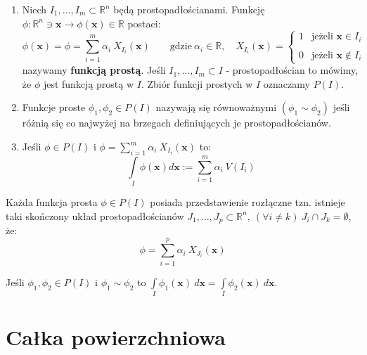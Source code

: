 \begin{df}
	\begin{enumerate}
		\item
		Niech $I_{1},\ldots,I_{m}\subset\mathbb{R}^{n}$ będą prostopadłościanami. Funkcję \linebreak[4]$\phi:\mathbb{R}^{n}\ni\mathbf x\rightarrow\phi(\mathbf x)\in\mathbb{R}$ postaci:
		\begin{displaymath}
		\phi(\mathbf x)=\phi=\sum_{i=1}^{m}\alpha_{i}\ X_{I_{i}}(\mathbf x)\qquad\textrm{gdzie}\ \alpha_{i}\in\mathbb{R},\quad X_{I_{i}}(\mathbf x)=\left\{\begin{array}{ll}
		1  & \textrm{jeżeli $\mathbf x\in I_{i}$}
		\\
		\\0 & \textrm{jeżeli $\mathbf x\notin I_{i}$}
		\end{array} \right.
		\end{displaymath}
		nazywamy \textbf{funkcją prostą}. Jeśli $I_{1},\ldots,I_{m}\subset I$ - prostopadłościan to mówimy, że $\phi$ jest funkcją prostą w $I$. Zbiór funkcji prostych w $I$ oznaczamy $P(I)$.
		\item
		Funkcje proste $\phi_{1},\phi_{2}\in P(I)$ nazywają się równoważnymi $(\phi_{1}\sim\phi_{2})$ jeśli różnią się co najwyżej na brzegach definiujących je prostopadłościanów.
		\item
		Jeśli $\phi\in P(I)$ i $\displaystyle\phi=\sum_{i=1}^{m}\alpha_{i}\ X_{I_{i}}(\mathbf x)$ to:
		$$\int\limits_{I}\phi(\mathbf x)d\mathbf x:=\sum_{i=1}^{m}\alpha_{i}\ V(I_{i})$$
	\end{enumerate}
\end{df}

\begin{uwg}
	Każda funkcja prosta $\phi\in P(I)$ posiada przedstawienie rozłączne tzn. istnieje taki skończony układ prostopadłościanów $J_{1},\ldots,J_{p}\subset\mathbb{R}^{n},\ (\forall i\neq k)\ J_i\cap J_k=\emptyset$, że: $$\displaystyle\phi=\sum_{i=1}^{p}\alpha_{i}\ X_{J_{i}}(\mathbf x)$$
\end{uwg}

\begin{ft}
	Jeśli $\phi_1,\phi_2\in P(I)$ i $\phi_1\sim\phi_2$ to $\displaystyle\int\limits_I\phi_1(\mathbf x)\:d\mathbf x=\int\limits_I\phi_2(\mathbf x)\:d\mathbf x$.
\end{ft}

\section{Całka powierzchniowa}

